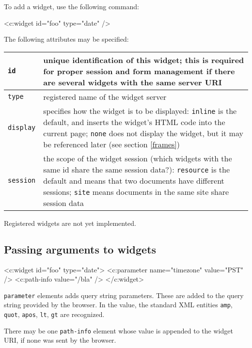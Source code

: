 \documentclass[a4paper,12pt]{article}
\begin{document}
To add a widget, use the following command:

\begin{verbatim*}
<c:widget id="foo" type="date" />
\end{verbatim*}

The following attributes may be specified:

\begin{longtable}{|l|p{8cm}|}
\hline
\texttt{id} & unique identification of this widget; this is required
for proper session and form management if there are several widgets
with the same server URI \\
\hline
\texttt{type} & registered name of the widget server \\

\hline

\texttt{display} & specifies how the widget is to be displayed:
\texttt{inline} is the default, and inserts the widget's HTML code
into the current page; \texttt{none} does not display the widget, but
it may be referenced later (see section \ref{frames}) \\

\hline
\texttt{session} & the scope of the widget session (which widgets with
the same id share the same session data?): \texttt{resource} is the
default and means that two documents have different sessions;
\texttt{site} means documents in the same site share session data \\

\hline
\end{longtable}

Registered widgets are not yet implemented.

\subsection{Passing arguments to widgets}

\begin{verbatim*}
<c:widget id="foo" type="date">
  <c:parameter name="timezone" value="PST" />
  <c:path-info value="/bla" />
</c:widget>
\end{verbatim*}

\texttt{parameter} elements adds query string parameters.  These are
added to the query string provided by the browser.  In the value, the
standard XML entities \texttt{amp}, \texttt{quot}, \texttt{apos},
\texttt{lt}, \texttt{gt} are recognized.

There may be one \texttt{path-info} element whose value is appended to
the widget URI, if none was sent by the browser.
\end{document}
